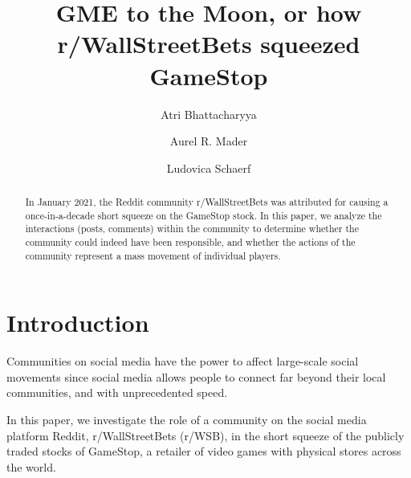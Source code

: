 \documentclass[noacm,sigconf,authorversion]{acmart}
\begin{document}
%
 
 
\title{GME to the Moon, or how r/WallStreetBets squeezed GameStop} 

\author{Atri Bhattacharyya}

\author{Aurel R. Mader}

\author{Ludovica Schaerf}

\begin{abstract}
  In January 2021, the Reddit community r/WallStreetBets was attributed 
  for causing a once-in-a-decade short squeeze on the GameStop stock.
  In this paper, we analyze the interactions (posts, comments) within 
  the community to determine whether the community could indeed have been
  responsible, and whether the actions of the community represent a 
  mass movement of individual players.
\end{abstract}



\maketitle

\section{Introduction}

Communities on social media have the power to affect large-scale social movements since social
media allows people to connect far beyond their local communities, and with unprecedented speed. %

In this paper, we investigate the role of a community on the social media platform Reddit, r/WallStreetBets (r/WSB), in the short 
squeeze of the publicly traded stocks of GameStop, a retailer of video games with physical stores across the world.
\end{document}
